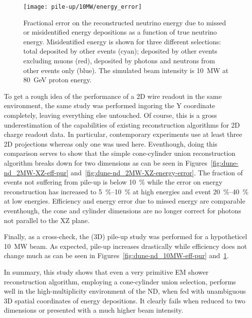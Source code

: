\begin{figure}[htb]
	\centering
	\texttt{[image: pile-up/10MW/energy\_error]}
	\caption{Fractional error on the reconstructed neutrino energy due to missed or misidentified energy depositions as a function of true neutrino energy.
	Misidentified energy is shown for three different selections: total deposited by other events (cyan); deposited by other events excluding muons (red), deposited by photons and neutrons from other events only (blue).
	The simulated beam intensity is \SI{10}{\mega\watt} at \SI{80}{\giga\electronvolt} proton energy.}
	\label{fig:dune-nd_10MW-energy-error}
\end{figure}

To get a rough idea of the performance of a 2D wire readout in the same environment, the same study was performed ingoring the Y coordinate completely, leaving everything else untouched.
Of course, this is a gross underestimation of the capabilities of existing reconstruction algorithms for 2D charge readout data.
In particular, contemporary experiments use at least three 2D projections whereas only one was used here.
Eventhough, doing this comparison serves to show that the simple cone-cylinder union reconstruction algorithm breaks down for two dimensions as can be seen in Figures~\ref{fig:dune-nd_2MW-XZ-eff-pur} and~\ref{fig:dune-nd_2MW-XZ-energy-error}.
The fraction of events not suffering from pile-up is below \SI{10}{\percent} while the error on energy reconstruction has increased to \SIrange{5}{10}{\percent} at high energies and event \SIrange{20}{40}{\percent} at low energies.
Efficiency and energy error due to missed energy are comparable eventhough, the cone and cylinder dimensions are no longer correct for photons not parallel to the XZ plane.

Finally, as a cross-check, the (3D) pile-up study was performed for a hypotheticel \SI{10}{\mega\watt} beam.
As expected, pile-up increases drastically while efficiency does not change much as can be seen in Figures~\ref{fig:dune-nd_10MW-eff-pur} and~\ref{fig:dune-nd_10MW-energy-error}.

In summary, this study shows that even a very primitive EM shower reconstruction algorithm, employing a cone-cylinder union selection, performs well in the high-multiplicity environment of the \dune{} ND, when fed with unambiguous 3D spatial coordinates of energy depositions.
It clearly fails when reduced to two dimensions or presented with a much higher beam intensity.